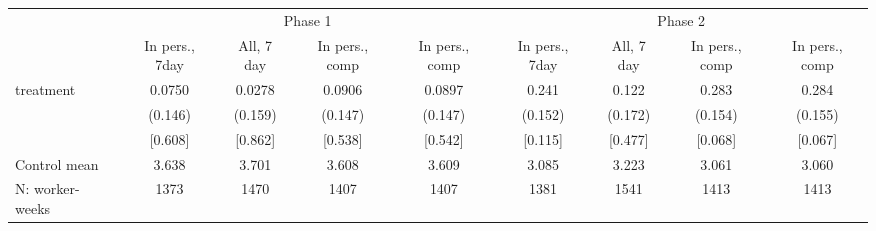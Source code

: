 \begin{tabular}{l*{8}{c}}
\toprule
            &\multicolumn{4}{c}{Phase 1}                        &\multicolumn{4}{c}{Phase 2}                        \\\cmidrule(lr){2-5}\cmidrule(lr){6-9}
            &\multicolumn{1}{c}{In pers., 7day}&\multicolumn{1}{c}{All, 7 day}&\multicolumn{1}{c}{In pers., comp}&\multicolumn{1}{c}{In pers., comp}&\multicolumn{1}{c}{In pers., 7day}&\multicolumn{1}{c}{All, 7 day}&\multicolumn{1}{c}{In pers., comp}&\multicolumn{1}{c}{In pers., comp}\\
\midrule
treatment   &      0.0750&      0.0278&      0.0906&      0.0897&       0.241&       0.122&       0.283&       0.284\\
            &     (0.146)&     (0.159)&     (0.147)&     (0.147)&     (0.152)&     (0.172)&     (0.154)&     (0.155)\\
            &     [0.608]&     [0.862]&     [0.538]&     [0.542]&     [0.115]&     [0.477]&     [0.068]&     [0.067]\\
\midrule
Control mean&       3.638&       3.701&       3.608&       3.609&       3.085&       3.223&       3.061&       3.060\\
N: worker-weeks&        1373&        1470&        1407&        1407&        1381&        1541&        1413&        1413\\
\bottomrule
\end{tabular}
